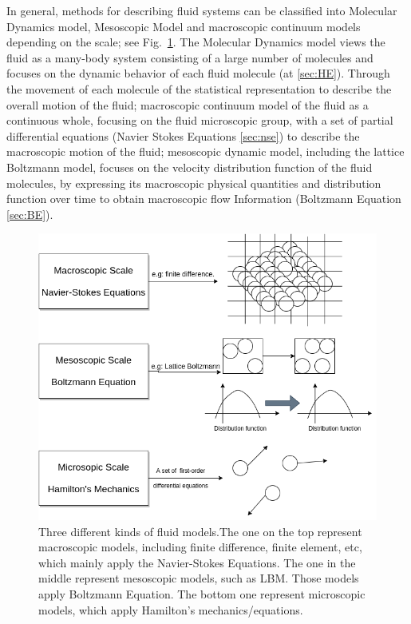 In general, methods for describing fluid systems can be classified into Molecular Dynamics model, Mesoscopic Model and macroscopic continuum models depending on the scale; see Fig.~\ref{fig:fluid_models}. The Molecular Dynamics model views the fluid as a many-body system consisting of a large number of molecules and focuses on the dynamic behavior of each fluid molecule (at \ref{sec:HE}). Through the movement of each molecule of the statistical representation to describe the overall motion of the fluid; macroscopic continuum model of the fluid as a continuous whole, focusing on the fluid microscopic group, with a set of partial differential equations (Navier Stokes Equations \ref{sec:nse}) to describe the macroscopic motion of the fluid; mesoscopic dynamic model, including the lattice Boltzmann model, focuses on the velocity distribution function of the fluid molecules, by expressing its macroscopic physical quantities and distribution function over time to obtain macroscopic flow Information (Boltzmann Equation \ref{sec:BE}). \\

\begin{figure}[!tb]
   \centering
       \includegraphics[width=1\textwidth]{figures/comparsion.png}
       \caption{Three different kinds of fluid models.The one on the top represent macroscopic models, including finite difference, finite element, etc, which mainly apply the Navier-Stokes Equations. The one in the middle represent mesoscopic models, such as LBM. Those models apply Boltzmann Equation. The bottom one represent microscopic models, which apply Hamilton's mechanics/equations. }
       \label{fig:fluid_models}
\end{figure}

